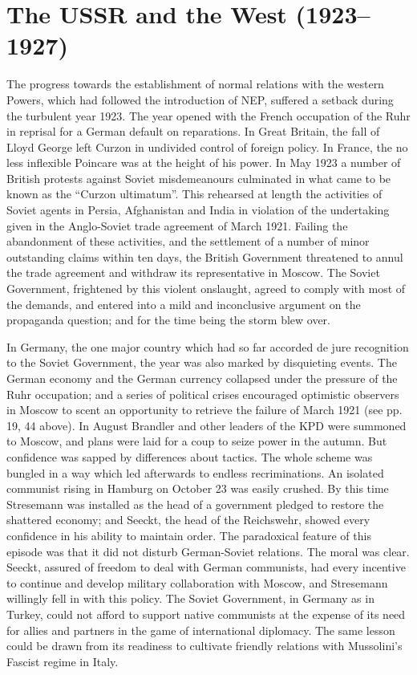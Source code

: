 \chapter{The USSR and the West (1923--1927)}

The progress towards the establishment of normal relations with the western Powers, which had followed the introduction of NEP, suffered a setback during the turbulent year 1923. The year opened with the French occupation of the Ruhr in reprisal for a German default on reparations. In Great Britain, the fall of Lloyd George left Curzon in undivided control of foreign policy. In France, the no less inflexible Poincare was at the height of his power. In May 1923 a number of British protests against Soviet misdemeanours culminated in what came to be known as the ``Curzon ultimatum''. This rehearsed at length the activities of Soviet agents in Persia, Afghanistan and India in violation of the undertaking given in the Anglo-Soviet trade agreement of March 1921. Failing the abandonment of these activities, and the settlement of a number of minor outstanding claims within ten days, the British Government threatened to annul the trade agreement and withdraw its representative in Moscow. The Soviet Government, frightened by this violent onslaught, agreed to comply with most of the demands, and entered into a mild and inconclusive argument on the propaganda question; and for the time being the storm blew over. 

In Germany, the one major country which had so far accorded de jure recognition to the Soviet Government, the year was also marked by disquieting events. The German economy and the German currency collapsed under the pressure of the Ruhr occupation; and a series of political crises encouraged optimistic observers in Moscow to scent an opportunity to retrieve the failure of March 1921 (see pp. 19, 44 above). In August Brandler and other leaders of the KPD were summoned to Moscow, and plans were laid for a coup to seize power in the autumn. But confidence was sapped by differences about tactics. The whole scheme was bungled in a way which led afterwards to endless recriminations. An isolated communist rising in Hamburg on October 23 was easily crushed. By this time Stresemann was installed as the head of a government pledged to restore the shattered economy; and Seeckt, the head of the Reichswehr, showed every confidence in his ability to maintain order. The paradoxical feature of this episode was that it did not disturb German-Soviet relations. The moral was clear. Seeckt, assured of freedom to deal with German communists, had every incentive to continue and develop military collaboration with Moscow, and Stresemann willingly fell in with this policy. The Soviet Government, in Germany as in Turkey, could not afford to support native communists at the expense of its need for allies and partners in the game of international diplomacy. The same lesson could be drawn from its readiness to cultivate friendly relations with Mussolini's Fascist regime in Italy. 

